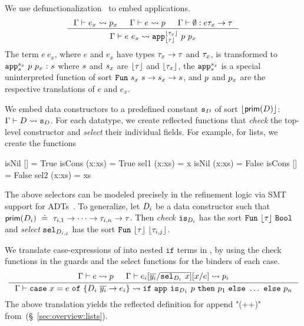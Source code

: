 %
We use defunctionalization~\citep{Reynolds72} to 
embed applications. 
%
$$
\inference{
	\tologicshort{\env}{e_x}{\typ_x}{\pred_x}{\tosmt{\typ_x}}{\smtenv}{\axioms'}
	&
	\tologicshort{\env}{e}{\trfun{x}{\typ_x}{\typ}}{\pred}{\tsmtfun{\tosmt{\typ_x}}{\tosmt{\typ}}}{\smtenv}{\axioms}
	&
	\hastype{\env}{\emptyset}{e}{{\typ_x}\rightarrow{\typ}}
}{
	\tologicshort{\env}{e\ e_x}{\typ}{\smtappname{\tosmt{\typ_x}}{\tosmt{\typ}}\ {\pred}\ {\pred_x}}{\tosmt{\typ}}{\smtenv}{\andaxioms{\axioms}{\axioms'}}
}%
$$
%
The term ${e\ e_x}$, where $e$ and $e_x$ have
types ${\tau_x \rightarrow \tau}$ and $\tau_x$,
is transformed to
${{\texttt{app}^{s_x}_{s}\ p\ p_x} \ \text{:}\ {s}}$
where
%
$s$ and $s_x$ are $\lfloor \tau\rfloor $ and $\lfloor \tau_x\rfloor $,
the
${\texttt{app}^{s_x}_{s}}$
is a special uninterpreted function of sort
${\mathtt{Fun}\ {s_x}\ {s} \rightarrow s_x \rightarrow s}$,
and
$p$ and $p_x$ are the respective translations of $e$ and $e_x$.


%
We embed data constructors to a predefined
\smtlan constant ${\texttt{s}_{D}}$ of
sort ${\lfloor \mathsf{prim}(D)\rfloor }$:
$
	 \Gamma\vdash D \rightsquigarrow \texttt{s}_{D} 
$.
%
For each datatype, we 
create reflected functions
that \emph{check} the top-level
constructor and \emph{select}
their individual fields.
%
For example, for lists, we
create the functions
%
\begin{mcode}
    isNil []     = True         isCons (x:xs) = True          sel1 (x:xs) = x
    isNil (x:xs) = False        isCons []     = False         sel2 (x:xs) = xs
\end{mcode}
%
The above selectors can be
modeled precisely in the refinement
logic via SMT support for ADTs~\cite{Nelson81}.
%
To generalize, let $D_i$ be a
data constructor such that
$
\mathsf{prim}(D_i) \ \doteq\  \tau_{i,1} \rightarrow \dots \rightarrow \tau_{i,n} \rightarrow \tau
$.
Then \emph{check}
${\texttt{is}_{{D_i}}}$ has the sort
$\mathtt{Fun}\ {\lfloor \tau\rfloor }\ {\texttt{Bool}}$
and \emph{select}
${\texttt{sel}_{{D}_{i,j}}}$ has the sort
$\mathtt{Fun}\ {\lfloor \tau\rfloor }\ {\lfloor \tau_{i,j}\rfloor }$.
%

%
We translate case-expressions
of \corelan into nested $\mathtt{if}$
terms in \smtlan, by using the check
functions in the guards and the
select functions for the binders
of each case.
$$
\inference{
	\tologicshort{\env}{e}{\typ_e}{\pred}{\tosmt{\typ_e}}{\smtenv}{\axioms} &&
	\tologicshort{\env}{e_i\subst{\overline{y_i}}{\overline{\selector{\dc_i}{}\ x}}\subst{x}{e}}{\typ}{\pred_i}{\tosmt{\typ}}{\smtenv}{\axioms_i}
}{
	\tologicshort{\env}{\ecase{x}{e}{\dc_i}{\overline{y_i}}{e_i}}{\typ}
	 {\eif{\smtappname{}{}\ \checkdc{\dc_1}\ \pred}{\pred_1}{\ldots} \ \mathtt{else}\ \pred_n}{\tosmt{\typ}}{\smtenv}
	 {\andaxioms{\axioms}{\axioms_i}}
}%
$$
%
The above translation yields the reflected definition
for append "(++)" from~(\S~\ref{sec:overview:lists}).

